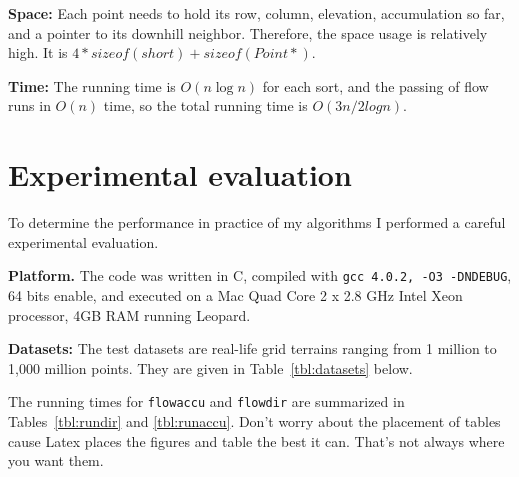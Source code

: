 \documentclass[11pt,twocolumn]{article}
\begin{document}
{\bf Space:} Each point needs to hold its row, column, elevation,
accumulation so far, and a pointer to its downhill neighbor.
Therefore, the space usage is relatively high.  It is $4*sizeof(short)
+ sizeof(Point*)$.

{\bf Time: } The running time is $O(n \log n)$ for each sort, and the
passing of flow runs in $O(n)$ time, so the total running time is
$O(3n /2logn)$.


\section{Experimental evaluation}

To determine the performance in practice of my algorithms I performed
a careful experimental evaluation.

{\bf Platform.} The code was written in C, compiled with \texttt{gcc
  4.0.2, -O3 -DNDEBUG}, 64 bits enable, and executed on a Mac Quad
Core 2 x 2.8 GHz Intel Xeon processor, 4GB RAM running Leopard.

{\bf Datasets: } The test datasets are real-life grid terrains ranging
from 1 million to 1,000 million points.  They are given in
Table~\ref{tbl:datasets} below.


\begin{table}[htp]
  \caption{Size of terrain datasets.}
  \label{tbl:datasets}
\end{table}
      

The running times for \texttt{flowaccu} and \texttt{flowdir} are
summarized in Tables~\ref{tbl:rundir} and \ref{tbl:runaccu}. Don't
worry about the placement of tables cause Latex places the figures and
table the best it can. That's not always where you want them.

\begin{table}[htp]
  \caption{Running times (seconds) and CPU-utilization for
    \texttt{flowdir}.}
  \label{tbl:rundir}
\end{table}
\end{document}
